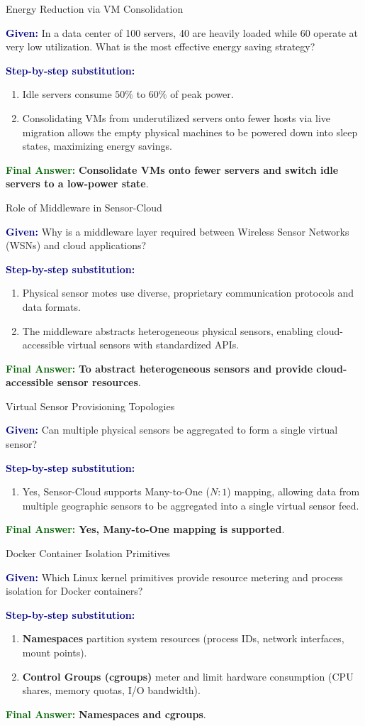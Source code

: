 \documentclass[11pt,a4paper,openany]{report}
\newcommand{\Given}{\par\textbf{\textcolor{navy}{Given:}} }
\newcommand{\Steps}{\par\textbf{\textcolor{navy}{Step-by-step substitution:}}\par}
\newcommand{\Answer}{\par\textbf{\textcolor{darkgreen}{Final Answer:}} }
\begin{document}
\begin{solved}{Energy Reduction via VM Consolidation}
\Given In a data center of 100 servers, 40 are heavily loaded while 60 operate at very low utilization. What is the most effective energy saving strategy?
\Steps
\begin{enumerate}[leftmargin=*]
  \item Idle servers consume $50\%$ to $60\%$ of peak power.
  \item Consolidating VMs from underutilized servers onto fewer hosts via live migration allows the empty physical machines to be powered down into sleep states, maximizing energy savings.
\end{enumerate}
\Answer \textbf{Consolidate VMs onto fewer servers and switch idle servers to a low-power state}.
\end{solved}

\begin{solved}{Role of Middleware in Sensor-Cloud}
\Given Why is a middleware layer required between Wireless Sensor Networks (WSNs) and cloud applications?
\Steps
\begin{enumerate}[leftmargin=*]
  \item Physical sensor motes use diverse, proprietary communication protocols and data formats.
  \item The middleware abstracts heterogeneous physical sensors, enabling cloud-accessible virtual sensors with standardized APIs.
\end{enumerate}
\Answer \textbf{To abstract heterogeneous sensors and provide cloud-accessible sensor resources}.
\end{solved}

\begin{solved}{Virtual Sensor Provisioning Topologies}
\Given Can multiple physical sensors be aggregated to form a single virtual sensor?
\Steps
\begin{enumerate}[leftmargin=*]
  \item Yes, Sensor-Cloud supports Many-to-One ($N:1$) mapping, allowing data from multiple geographic sensors to be aggregated into a single virtual sensor feed.
\end{enumerate}
\Answer \textbf{Yes, Many-to-One mapping is supported}.
\end{solved}

\begin{solved}{Docker Container Isolation Primitives}
\Given Which Linux kernel primitives provide resource metering and process isolation for Docker containers?
\Steps
\begin{enumerate}[leftmargin=*]
  \item \textbf{Namespaces} partition system resources (process IDs, network interfaces, mount points).
  \item \textbf{Control Groups (cgroups)} meter and limit hardware consumption (CPU shares, memory quotas, I/O bandwidth).
\end{enumerate}
\Answer \textbf{Namespaces and cgroups}.
\end{solved}
\end{document}
